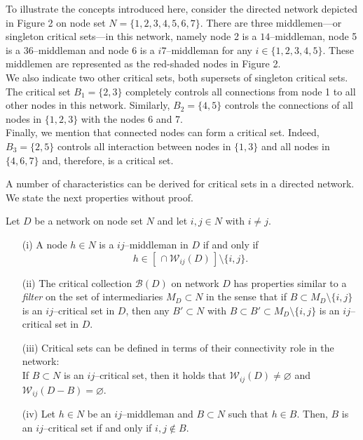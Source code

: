 \begin{example} \label{ex:Figure1}
To illustrate the concepts introduced here, consider the directed network depicted in Figure 2 on node set $N = \{ 1,2,3,4,5,6,7 \}$. There are three middlemen---or singleton critical sets---in this network, namely node 2 is a $14$--middleman, node 5 is a $36$--middleman and node 6 is a $i7$--middleman for any $i \in \{ 1,2,3,4,5 \}$. These middlemen are represented as the red-shaded nodes in Figure 2.
\\
We also indicate two other critical sets, both supersets of singleton critical sets. The critical set $B_1 = \{ 2,3 \}$ completely controls all connections from node 1 to all other nodes in this network. Similarly, $B_2 = \{ 4,5 \}$ controls the connections of all nodes in $\{ 1,2,3 \}$ with the nodes 6 and 7.
\\
Finally, we mention that connected nodes can form a critical set. Indeed, $B_3 = \{ 2,5 \}$ controls all interaction between nodes in $\{1,3 \}$ and all nodes in $\{ 4,6,7 \}$ and, therefore, is a critical set.
\end{example}
A number of characteristics can be derived for critical sets in a directed network. We state the next properties without proof.
\begin{property} \label{prop:blocks}
Let $D$ be a network on node set $N$ and let $i,j \in N$ with $i \neq j$.
\begin{itemize}
\item[(i)] A node $h \in N$ is a $ij$--middleman in $D$ if and only if
\[
h \in \left[ \, \cap \mathcal{W}_{ij} (D) \, \right] \setminus \{i,j\} .
\]

\item[(ii)] The critical collection $\mathcal{B} (D)$ on network $D$ has properties similar to a \emph{filter} on the set of intermediaries $M_D \subset N$ in the sense that if $B \subset M_D \setminus \{ i,j \}$ is an $ij$--critical set in $D$, then any $B' \subset N$ with $B \subset B' \subset M_D \setminus \{ i,j \}$ is an $ij$--critical set in $D$.

\item[(iii)] Critical sets can be defined in terms of their connectivity role in the network:
\\
If $B \subset N$ is an $ij$--critical set, then it holds that $\mathcal{W}_{ij}(D) \neq \varnothing$ and $\mathcal{W}_{ij}(D - B) = \varnothing$.

\item[(iv)] Let $h \in N$ be an $ij$--middleman and $B \subset N$ such that $h \in B$. Then, $B$ is an $ij$--critical set if and only if $i,j \notin B$.
\end{itemize}
\end{property}
